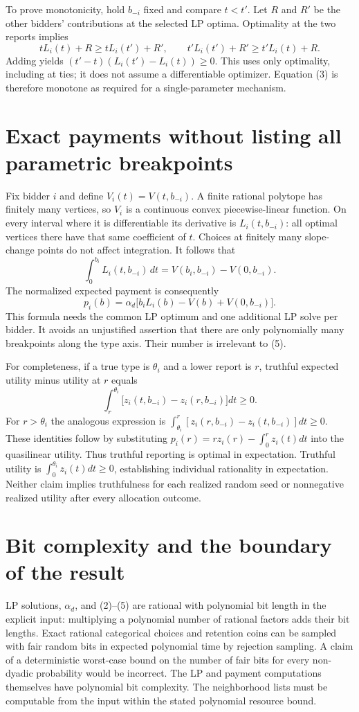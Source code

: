 \documentclass[11pt]{article}
\begin{document}
To prove monotonicity, hold $b_{-i}$ fixed and compare $t<t'$. Let $R$ and
$R'$ be the other bidders' contributions at the selected LP optima.
Optimality at the two reports implies
\[
 tL_i(t)+R\geq tL_i(t')+R',\qquad
 t'L_i(t')+R'\geq t'L_i(t)+R.
\]
Adding yields $(t'-t)(L_i(t')-L_i(t))\geq0$. This uses only optimality,
including at ties; it does not assume a differentiable optimizer. Equation
(3) is therefore monotone as required for a single-parameter mechanism.

\section*{Exact payments without listing all parametric breakpoints}
Fix bidder $i$ and define $V_i(t)=V(t,b_{-i})$. A finite rational polytope
has finitely many vertices, so $V_i$ is a continuous convex piecewise-linear
function. On every interval where it is differentiable its derivative is
$L_i(t,b_{-i})$: all optimal vertices there have that same coefficient of
$t$. Choices at finitely many slope-change points do not affect integration.
It follows that
\[
 \int_0^{b_i}L_i(t,b_{-i})\,dt=V(b_i,b_{-i})-V(0,b_{-i}).           \tag{4}
\]
The normalized expected payment is consequently
\[
 p_i(b)=\alpha_d\bigl[b_iL_i(b)-V(b)+V(0,b_{-i})\bigr].            \tag{5}
\]
This formula needs the common LP optimum and one additional LP solve per
bidder. It avoids an unjustified assertion that there are only polynomially
many breakpoints along the type axis. Their number is irrelevant to (5).

For completeness, if a true type is $\theta_i$ and a lower report is $r$,
truthful expected utility minus utility at $r$ equals
\[
 \int_r^{\theta_i}\bigl[z_i(t,b_{-i})-z_i(r,b_{-i})\bigr]dt\geq0.
\]
For $r>\theta_i$ the analogous expression is
$\int_{\theta_i}^r[z_i(r,b_{-i})-z_i(t,b_{-i})]dt\geq0$.
These identities follow by substituting
$p_i(r)=rz_i(r)-\int_0^r z_i(t)dt$ into the quasilinear utility.
Thus truthful reporting is optimal in expectation. Truthful utility is
$\int_0^{\theta_i}z_i(t)dt\geq0$, establishing individual rationality in
expectation. Neither claim implies truthfulness for each realized random
seed or nonnegative realized utility after every allocation outcome.

\section*{Bit complexity and the boundary of the result}
LP solutions, $\alpha_d$, and (2)--(5) are rational with polynomial bit
length in the explicit input: multiplying a polynomial number of rational
factors adds their bit lengths. Exact rational categorical choices and
retention coins can be sampled with fair random bits in expected polynomial
time by rejection sampling. A claim of a deterministic worst-case bound
on the number of fair bits for every non-dyadic probability would be
incorrect. The LP and payment computations themselves have polynomial
bit complexity. The neighborhood lists must be computable from the input
within the stated polynomial resource bound.
\end{document}

